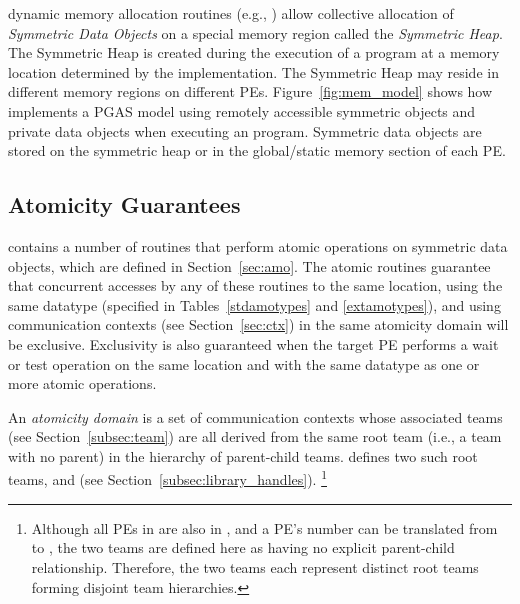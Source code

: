 \openshmem dynamic memory allocation routines (e.g.,
) allow collective allocation of \emph{Symmetric Data
Objects} on a special memory region called the \emph{Symmetric Heap}. The
Symmetric Heap is created during the execution of a program at a memory location
determined by the implementation. The Symmetric Heap may reside in different
memory regions on different \acp{PE}. Figure~\ref{fig:mem_model} shows how
\openshmem implements a \ac{PGAS} model using remotely accessible symmetric
objects and private data objects when executing an \openshmem program.
Symmetric data objects are stored on the symmetric heap or in the global/static
memory section of each \ac{PE}.

\subsection{Atomicity Guarantees}\label{subsec:amo_guarantees}

\openshmem contains a number of routines that perform atomic operations on
symmetric data objects, which are defined in Section~\ref{sec:amo}.
The atomic routines
guarantee that concurrent accesses by any of these routines to the same
location, using the same datatype (specified in Tables~\ref{stdamotypes} and
\ref{extamotypes}), and using communication contexts (see Section~\ref{sec:ctx})
in the same atomicity domain will be exclusive.
Exclusivity is also guaranteed when the target \ac{PE} performs a wait or test
operation on the same location and with the same datatype as one or more atomic
operations.

An \openshmem \emph{atomicity domain} is a set of communication
contexts whose associated teams (see Section~\ref{subsec:team}) are
all derived from the same root team (i.e., a team with no parent) in
the hierarchy of parent-child teams.
\openshmem defines two such root teams, 
and  (see Section~\ref{subsec:library_handles}).%
\footnote{
  Although all \acp{PE} in  are also
  in , and a \ac{PE}'s number can be
  translated from  to
  , the two teams are defined here as
  having no explicit parent-child relationship.
  Therefore, the two teams each represent distinct root teams forming
  disjoint team hierarchies.
}

